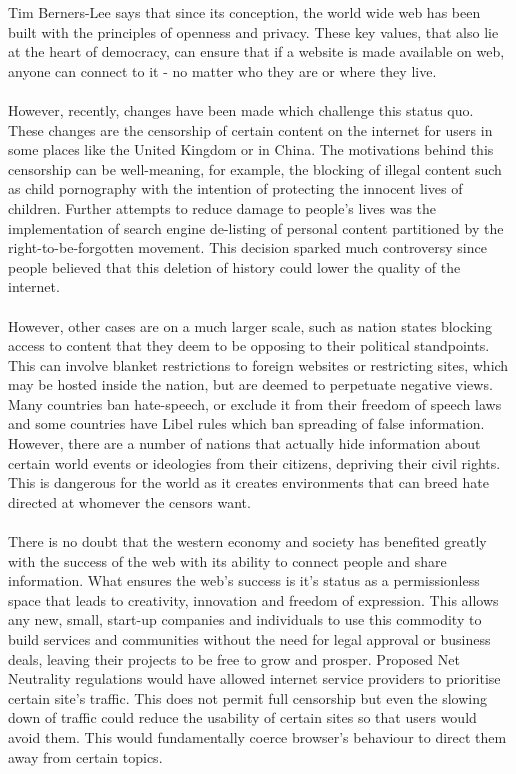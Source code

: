 \documentclass[12pt,a4paper]{article}
\begin{document}
Tim Berners-Lee says\cite{gard} that since its conception, the world wide web has been built with the principles of openness and privacy. These key values, that also lie at the heart of democracy, can ensure that if a website is made available on web, anyone can connect to it - no matter who they are or where they live. 
\\\\
However, recently, changes have been made which challenge this status quo. These changes are the censorship of certain content on the internet for users in some places like the United Kingdom or in China. The motivations behind this censorship can be well-meaning, for example, the blocking of illegal content such as child pornography with the intention of protecting the innocent lives of children. Further attempts to reduce damage to people's lives was the implementation of search engine de-listing of personal content partitioned by the right-to-be-forgotten movement\cite{rtbf}. This decision sparked much controversy since people believed that this deletion of history could lower the quality of the internet. 
\\\\
However, other cases are on a much larger scale, such as nation states blocking access to content that they deem to be opposing to their political standpoints. This can involve blanket restrictions to foreign websites or restricting sites, which may be hosted inside the nation, but are deemed to perpetuate negative views. Many countries ban hate-speech, or exclude it from their freedom of speech laws\cite{hate} and some countries have Libel rules\cite{libel} which ban spreading of false information. However, there are a number of nations that actually hide information about certain world events or ideologies from their citizens, depriving their civil rights\cite{chincensor}. This is dangerous for the world as it creates environments that can breed hate directed at whomever the censors want.
\\\\
There is no doubt that the western economy and society has benefited greatly with the success of the web with its ability to connect people and share information. What ensures the web's success is it's status as a permissionless space that leads to creativity, innovation and freedom of expression. This allows any new, small, start-up companies and individuals to use this commodity to build services and communities without the need for legal approval or business deals, leaving their projects to be free to grow and prosper. Proposed Net Neutrality regulations would have allowed internet service providers to prioritise certain site's traffic. This does not permit full censorship but even the slowing down of traffic could reduce the usability of certain sites so that users would avoid them. This would fundamentally coerce browser's behaviour to direct them away from certain topics.
\end{document}
